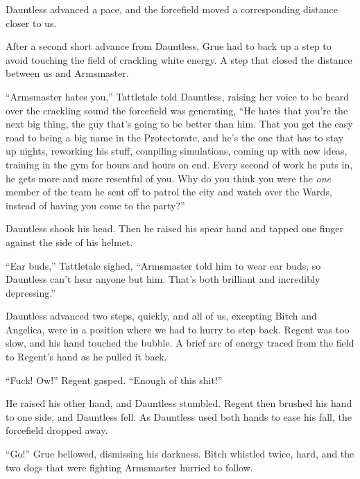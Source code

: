 Dauntless advanced a pace, and the forcefield moved a corresponding distance closer to us.



After a second short advance from Dauntless, Grue had to back up a step to avoid touching the field of crackling white energy.  A step that closed the distance between us and Armsmaster.



``Armsmaster hates you,'' Tattletale told Dauntless, raising her voice to be heard over the crackling sound the forcefield was generating, ``He hates that you're the next big thing, the guy that's going to be better than him.  That you get the easy road to being a big name in the Protectorate, and he's the one that has to stay up nights, reworking his stuff, compiling simulations, coming up with new ideas, training in the gym for hours and hours on end.  Every second of work he puts in, he gets more and more resentful of you.  Why do you think you were the \emph{one} member of the team he sent off to patrol the city and watch over the Wards, instead of having you come to the party?''



Dauntless shook his head.  Then he raised his spear hand and tapped one finger against the side of his helmet.



``Ear buds,'' Tattletale sighed, ``Armsmaster told him to wear ear buds, so Dauntless can't hear anyone but him.  That's both brilliant and incredibly depressing.''



Dauntless advanced two steps, quickly, and all of us, excepting Bitch and Angelica, were in a position where we had to hurry to step back.  Regent was too slow, and his hand touched the bubble.  A brief arc of energy traced from the field to Regent's hand as he pulled it back.



``Fuck!  Ow!''  Regent gasped.  ``Enough of this shit!''



He raised his other hand, and Dauntless stumbled.  Regent then brushed his hand to one side, and Dauntless fell.  As Dauntless used both hands to ease his fall, the forcefield dropped away.



``Go!'' Grue bellowed, dismissing his darkness.  Bitch whistled twice, hard, and the two dogs that were fighting Armsmaster hurried to follow.



